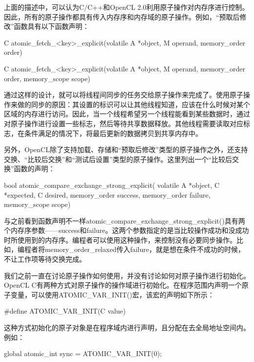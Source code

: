 上面的描述中，可以认为C/C++和OpenCL 2.0利用原子操作对内存序进行控制。因此，所有的原子操作都具有传入内存序和内存域的原子操作。例如，“预取后修改”函数具有以下函数声明：

\begin{codebox}[cpp]
C atomic_fetch_<key>_explicit(volatile A *object, M operand, memory_order order)

C atomic_fetch_<key>_explicit(volatile A *object, M operand, memory_order order, memory_scope scope)
\end{codebox}

通过这样的设计，就可以将线程间同步的任务交给原子操作来完成了。使用原子操作来做的同步的原因：其设置的标识可以让其他线程知道，应该在什么时候对某个区域的内存进行访问。因此，当一个线程希望另一个线程能看到某些数据时，通过对原子操作进行设置一些标志，然后等待共享数据释放。其他线程需要读取对应标志，在条件满足的情况下，将最后更新的数据拷贝到共享内存中。

另外，OpenCL除了支持加载、存储和“预取后修改”类型的原子操作之外，还支持交换、“比较后交换”和“测试后设置”类型的原子操作。这里列出一个“比较后交换”函数的声明：

\begin{codebox}[cpp]
bool
atomic_compare_exchange_strong_explicit(
  volatile A *object,
  C *expected,
  C desired,
  memory_order success,
  memory_order failure,
  memory_scope scope)
\end{codebox}

与之前看到函数声明不一样atomic\_\allowbreak{}compare\_\allowbreak{}exchange\_\allowbreak{}strong\_\allowbreak{}explicit()具有两个内存序参数——success和failure。这两个参数指定的是当比较操作成功和没成功时所使用到的内存序。编程者可以使用这种操作，来控制没有必要同步操作。比如，编程者将memory\_\allowbreak{}order\_\allowbreak{}relaxed传入failure，就是想在条件不成功的时候，不让工作项等待交换完成。

我们之前一直在讨论原子操作如何使用，并没有讨论如何对原子操作进行初始化。OpenCL C有两种方式对原子操作的操作域进行初始化。在程序范围内声明一个原子变量，可以使用ATOMIC\_\allowbreak{}VAR\_\allowbreak{}INIT()宏，该宏的声明如下所示：

\begin{codebox}[cpp]
#define ATOMIC_VAR_INIT(C value)
\end{codebox}

这种方式初始化的原子对象是在程序域内进行声明，且分配在去全局地址空间内。例如：

\begin{codebox}[cpp]
global atomic_int sync = ATOMIC_VAR_INIT(0);
\end{codebox}

